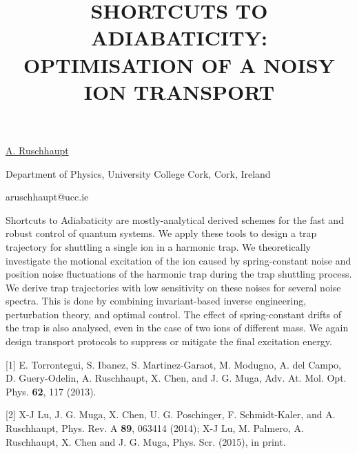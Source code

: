 \title{SHORTCUTS TO ADIABATICITY: OPTIMISATION OF A NOISY ION TRANSPORT}

\underline{A. Ruschhaupt} 

{\normalsize{\vspace{-4mm}
Department of Physics,
University College Cork,
Cork,
Ireland

\email aruschhaupt@ucc.ie}}

Shortcuts to Adiabaticity are mostly-analytical derived schemes for the fast and robust control of quantum systems. We apply these tools to design a trap trajectory for shuttling a single ion in a harmonic trap. We theoretically investigate the motional excitation of the ion caused by spring-constant noise and position noise fluctuations of the harmonic trap during the trap shuttling process. We derive trap trajectories with low sensitivity on these noises for several noise spectra. This is done by combining invariant-based inverse engineering, perturbation theory, and optimal control. The effect of spring-constant drifts of the trap is also analysed, even in the case of two ions of different mass. We again design transport protocols to suppress or mitigate the final excitation energy.

{\normalsize
[1] E. Torrontegui, S. Ibanez, S. Martinez-Garaot, M. Modugno, A. del Campo, D. Guery-Odelin, A. Ruschhaupt, X. Chen, and J. G. Muga, Adv. At. Mol. Opt. Phys. \textbf{62}, 117 (2013).
\vsp

[2] X-J Lu, J. G. Muga, X. Chen, U. G. Poschinger, F. Schmidt-Kaler, and A. Ruschhaupt, Phys. Rev. A \textbf{89}, 063414 (2014);
X-J Lu, M. Palmero, A. Ruschhaupt, X. Chen and J. G. Muga, Phys. Scr. (2015), in print.
}

\vspace{\baselineskip}
